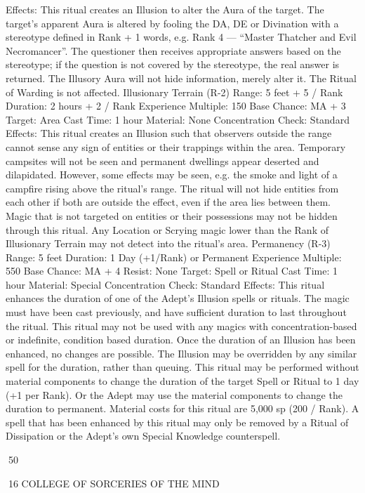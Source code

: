 \documentclass[a4paper]{article}
\begin{document}
\begin{multicols}{3}
Effects: This ritual creates an Illusion to alter the
Aura of the target. The target’s apparent Aura is
altered by fooling the DA, DE or Divination with a
stereotype defined in Rank + 1 words, e.g. Rank 4
— “Master Thatcher and Evil Necromancer”. The
questioner then receives appropriate answers based
on the stereotype; if the question is not covered by
the stereotype, the real answer is returned. The
Illusory Aura will not hide information, merely
alter it. The Ritual of Warding is not affected.
Illusionary Terrain (R-2)
Range: 5 feet + 5 / Rank
Duration: 2 hours + 2 / Rank
Experience Multiple: 150
Base Chance: MA + 3%
Target: Area
Cast Time: 1 hour
Material: None
Concentration Check: Standard
Effects: This ritual creates an Illusion such that
observers outside the range cannot sense any sign
of entities or their trappings within the area. Temporary campsites will not be seen and permanent
dwellings appear deserted and dilapidated. However, some effects may be seen, e.g. the smoke and
light of a campfire rising above the ritual’s range.
The ritual will not hide entities from each other if
both are outside the effect, even if the area lies
between them. Magic that is not targeted on entities or their possessions may not be hidden through
this ritual. Any Location or Scrying magic lower
than the Rank of Illusionary Terrain may not detect
into the ritual’s area.
Permanency (R-3)
Range: 5 feet
Duration: 1 Day (+1/Rank) or Permanent
Experience Multiple: 550
Base Chance: MA + 4%
Resist: None
Target: Spell or Ritual
Cast Time: 1 hour
Material: Special
Concentration Check: Standard
Effects: This ritual enhances the duration of one of
the Adept’s Illusion spells or rituals. The magic
must have been cast previously, and have sufficient
duration to last throughout the ritual. This ritual
may not be used with any magics with concentration-based or indefinite, condition based duration.
Once the duration of an Illusion has been enhanced, no changes are possible. The Illusion may
be overridden by any similar spell for the duration,
rather than queuing. This ritual may be performed
without material components to change the duration of the target Spell or Ritual to 1 day (+1 per
Rank). Or the Adept may use the material components to change the duration to permanent. Material
costs for this ritual are 5,000 sp (200 / Rank). A
spell that has been enhanced by this ritual may
only be removed by a Ritual of Dissipation or the
Adept’s own Special Knowledge counterspell.

50

16 COLLEGE OF SORCERIES OF THE MIND


\end{multicols}
\end{document}
